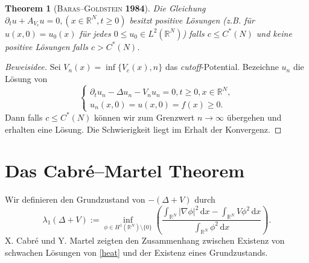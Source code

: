 \documentclass[11pt]{article}
\newtheorem{thm}{Theorem}
\theoremstyle{break}
\begin{document}
\begin{thm}[\textsc{Baras--Goldstein} \textbf{1984}]\label{main}
Die Gleichung  $\partial_t u + A_{V_c} u =0, (x\in \mathbb R^N, t\ge0)$ besitzt positive L\"osungen (z.B. f\"ur $u(x,0)=u_0(x)$ f\"ur jedes $0\le u_0\in L^2(\mathbb R^N)$) falls $c\le C^*(N)$ und keine positive L\"osungen falls $c>C^*(N)$.
\end{thm}
\begin{proof}[Beweisidee]
Sei $V_n(x)=\inf\{V_c(x), n\}$ das \emph{cutoff}-Potential. Bezeichne $u_n$ die L\"osung von
\begin{equation}\label{cutoff}
\begin{cases}
\partial_t u_n - \Delta u_n - V_n u_n =0, t\ge 0, x\in \mathbb R^N,\\
u_n(x,0)=u(x,0)=f(x)\ge 0.
\end{cases}
\end{equation}
Dann falls $c\le C^*(N)$ k\"onnen wir zum Grenzwert $n\to \infty$ \"ubergehen und erhalten eine L\"osung.  Die Schwierigkeit liegt im Erhalt der Konvergenz.
\end{proof}

\section{Das Cabr\'e--Martel Theorem}

Wir definieren den Grundzustand von $-(\Delta +V)$ durch
\begin{equation}\label{groundstate}
\lambda_1(\Delta + V):= \inf_{\phi \in H^1(\mathbb R^N)\setminus \{0\}} \left ( \frac{\int_{\mathbb R^N} |\nabla \phi|^2\, \mathrm dx - \int_{\mathbb R^N} V\phi^2\, \mathrm dx}{\int_{\mathbb R^N} \phi^2\, \mathrm dx} \right ).
\end{equation}
X. Cabr\'e und Y. Martel zeigten den Zusammenhang zwischen Existenz von schwachen L\"osungen von \eqref{heat} und der Existenz eines Grundzustands. 

\vspace{.25cm}
\end{document}
